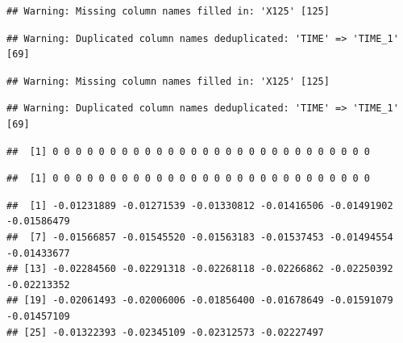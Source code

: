\documentclass[
]{krantz}
\makeatletter
\newenvironment{Shaded}{\begin{snugshade}}{\end{snugshade}}
\newcommand{\NormalTok}[1]{#1}
\newcommand{\SpecialCharTok}[1]{\textcolor[rgb]{0.00,0.00,0.00}{#1}}
\newenvironment{kframe}{%
\medskip{}
\setlength{\fboxsep}{.8em}
 \def\at@end@of@kframe{}%
 \ifinner\ifhmode%
  \def\at@end@of@kframe{\end{minipage}}%
  \begin{minipage}{\columnwidth}%
 \fi\fi%
 \def\FrameCommand##1{\hskip\@totalleftmargin \hskip-\fboxsep
 \colorbox{shadecolor}{##1}\hskip-\fboxsep
     \hskip-\linewidth \hskip-\@totalleftmargin \hskip\columnwidth}%
 \MakeFramed {\advance\hsize-\width
   \@totalleftmargin\z@ \linewidth\hsize
   \@setminipage}}%
 {\par\unskip\endMakeFramed%
 \at@end@of@kframe}
\renewenvironment{Shaded}{\begin{kframe}}{\end{kframe}}
\makeatother
\begin{document}
\begin{verbatim}
## Warning: Missing column names filled in: 'X125' [125]
\end{verbatim}

\begin{verbatim}
## Warning: Duplicated column names deduplicated: 'TIME' => 'TIME_1' [69]
\end{verbatim}

\begin{verbatim}
## Warning: Missing column names filled in: 'X125' [125]
\end{verbatim}

\begin{verbatim}
## Warning: Duplicated column names deduplicated: 'TIME' => 'TIME_1' [69]
\end{verbatim}

\begin{Shaded}
\end{Shaded}

\begin{verbatim}
##  [1] 0 0 0 0 0 0 0 0 0 0 0 0 0 0 0 0 0 0 0 0 0 0 0 0 0 0 0 0
\end{verbatim}

\begin{Shaded}
\end{Shaded}

\begin{verbatim}
##  [1] 0 0 0 0 0 0 0 0 0 0 0 0 0 0 0 0 0 0 0 0 0 0 0 0 0 0 0 0
\end{verbatim}

\begin{Shaded}
\end{Shaded}

\begin{verbatim}
##  [1] -0.01231889 -0.01271539 -0.01330812 -0.01416506 -0.01491902 -0.01586479
##  [7] -0.01566857 -0.01545520 -0.01563183 -0.01537453 -0.01494554 -0.01433677
## [13] -0.02284560 -0.02291318 -0.02268118 -0.02266862 -0.02250392 -0.02213352
## [19] -0.02061493 -0.02006006 -0.01856400 -0.01678649 -0.01591079 -0.01457109
## [25] -0.01322393 -0.02345109 -0.02312573 -0.02227497
\end{verbatim}
\end{document}
